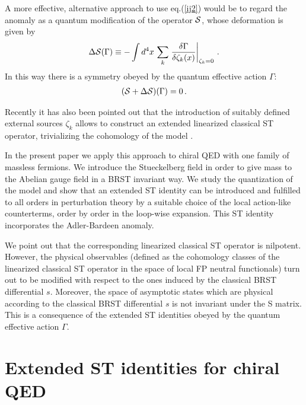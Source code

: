 \documentclass[a4paper,11pt]{article}
\def\G{\Gamma}
\begin{document}
A more effective, alternative approach to use eq.(\ref{ij2})
would be to regard the anomaly
as a quantum modification of the operator ${\cal S}$,
whose deformation is given by
%
\begin{eqnarray}
\Delta {\cal S}(\G) \equiv - 
\int d^4x \, \sum_k \left . {\delta \G  \over \delta \zeta_k(x)} 
\right |_{\zeta_k=0} \, .
\label{ij4}
\end{eqnarray}
%
In this way there is a symmetry obeyed by the quantum effective action
$\G$: 
%
\begin{eqnarray}
({\cal S} + \Delta {\cal S})(\G)=0 \, .
\label{ij5}
\end{eqnarray}
%

Recently it has also been pointed out that the introduction of suitably 
defined external sources $\zeta_k$ allows to construct an extended 
linearized classical ST operator, trivializing the cohomology of the model
\cite{barnich}.

In the present paper we apply this approach to chiral QED with one family of 
massless fermions.
We introduce the Stueckelberg field in order to give mass to the
Abelian gauge field in a BRST invariant way.
We study the quantization of the model and 
show that an extended ST identity can be introduced
and fulfilled to all orders in perturbation theory by a suitable choice
of the local action-like counterterms, order by order in the loop-wise
expansion.
This ST identity incorporates the Adler-Bardeen anomaly.

We point out that the corresponding linearized classical ST operator
is nilpotent. However, the physical observables (defined as the cohomology classes
of the linearized classical ST operator in the space of local FP neutral functionals)
turn out to be modified with respect to the ones induced by the classical BRST differential $s$.
Moreover, the space of asymptotic states which are physical
according to the classical BRST differential $s$ 
is not invariant under the S matrix.
This is a consequence of the extended ST identities obeyed by the
quantum effective action $\G$.

\section{Extended ST identities for chiral QED} \label{sec:QED}
\end{document}
